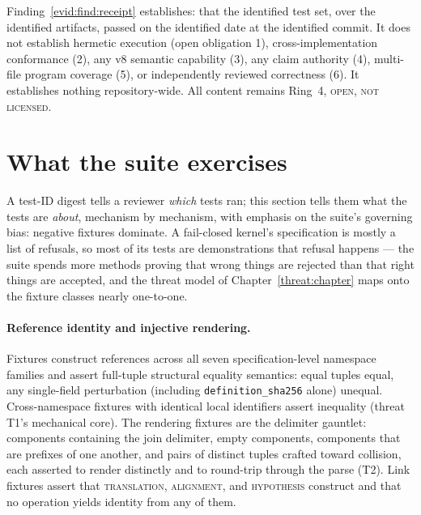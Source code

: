 \begin{boundary}\label{evid:bd:receipt}
Finding~\ref{evid:find:receipt} establishes: that the identified test set, over the identified artifacts, passed on the identified date at the identified commit. It does not establish hermetic execution (open obligation 1), cross-implementation conformance (2), any v8 semantic capability (3), any claim authority (4), multi-file program coverage (5), or independently reviewed correctness (6). It establishes nothing repository-wide. All content remains Ring~4, \textsc{open}, \textsc{not licensed}.
\end{boundary}

\section{What the suite exercises}\label{evid:suite}

A test-ID digest tells a reviewer \emph{which} tests ran; this section tells them what the tests are \emph{about}, mechanism by mechanism, with emphasis on the suite's governing bias: negative fixtures dominate. A fail-closed kernel's specification is mostly a list of refusals, so most of its tests are demonstrations that refusal happens --- the suite spends more methods proving that wrong things are rejected than that right things are accepted, and the threat model of Chapter~\ref{threat:chapter} maps onto the fixture classes nearly one-to-one.

\paragraph{Reference identity and injective rendering.} Fixtures construct references across all seven specification-level namespace families and assert full-tuple structural equality semantics: equal tuples equal, any single-field perturbation (including \texttt{definition\_sha256} alone) unequal. Cross-namespace fixtures with identical local identifiers assert inequality (threat T1's mechanical core). The rendering fixtures are the delimiter gauntlet: components containing the join delimiter, empty components, components that are prefixes of one another, and pairs of distinct tuples crafted toward collision, each asserted to render distinctly and to round-trip through the parse (T2). Link fixtures assert that \textsc{translation}, \textsc{alignment}, and \textsc{hypothesis} construct and that no operation yields identity from any of them.

